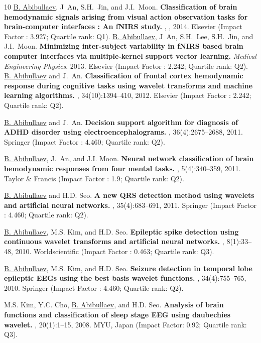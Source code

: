 \documentclass[10pt,letterpaper,sans]{moderncv}   %
\begin{document}
\begin{thebibliography}{10}
    \underline{B. Abibullaev}, J~An, S.H.~Jin, and J.I.~Moon.
    \newblock \textbf{Classification of brain hemodynamic signals arising from
    visual action observation tasks for brain-computer interfaces : An {fNIRS} study. }, , 2014. Elsevier (Impact Factor : 3.927; Quartile rank: Q1).
    \underline{B. Abibullaev}, J~An, S.H.~Lee, S.H.~Jin, and J.I.~Moon.
    \newblock \textbf{Minimizing inter-subject variability in {fNIRS} based brain computer interfaces via multiple-kernel support vector learning.}
     {\em Medical Engineering Physics}, 2013. Elsevier (Impact Factor : 2.242; Quartile rank: Q2).
    \underline{B. Abibullaev} and J.~An.
    \newblock \textbf{Classification of frontal cortex hemodynamic response during cognitive tasks using wavelet transforms and machine learning algorithms.}
    , 34(10):1394--410, 2012. Elsevier (Impact Factor : 2.242; Quartile rank: Q2).
    
    \underline{B. Abibullaev} and J.~An.
    \newblock \textbf{Decision support algorithm for diagnosis of {ADHD} disorder using electroencephalograms.}
    , 36(4):2675--2688, 2011. Springer (Impact Factor : 4.460; Quartile rank: Q2).
    
    \underline{B. Abibullaev}, J.~An, and J.I. Moon.
    \newblock \textbf{Neural network classification of brain hemodynamic responses from four mental tasks.} , 5(4):340--359, 2011. Taylor \&  Francis (Impact Factor : 1.9; Quartile rank: Q2).
    
    \underline{B. Abibullaev} and H.D. Seo.
    \newblock \textbf{A new {QRS} detection method using wavelets and artificial neural networks.} , 35(4):683--691, 2011. Springer (Impact Factor : 4.460; Quartile rank: Q2).
    
    \underline{B. Abibullaev}, M.S. Kim, and H.D. Seo.
    \newblock \textbf{Epileptic spike detection using continuous wavelet transforms and artificial neural networks.} , 8(1):33--48, 2010.  Worldscientific (Impact Factor : 0.463; Quartile rank: Q3).
    
    \underline{B. Abibullaev}, M.S. Kim, and H.D. Seo.
    \newblock \textbf{Seizure detection in temporal lobe epileptic {EEGs} using the best basis wavelet functions.} , 34(4):755--765, 2010. Springer (Impact Factor : 4.460; Quartile rank: Q2).
    
    M.S. Kim, Y.C. Cho, \underline{B. Abibullaev}, and H.D. Seo.
    \newblock \textbf{Analysis of brain functions and classification of sleep stage {EEG} using daubechies wavelet.} , 20(1):1--15, 2008. MYU, Japan (Impact Factor: 0.92; Quartile rank: Q3).

\end{thebibliography}
\end{document}
